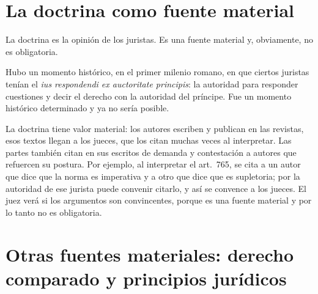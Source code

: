 \documentclass[12pt,oneside]{book}
\begin{document}
\section{La doctrina como fuente material}

La doctrina es la opinión de los juristas. Es una fuente material y, obviamente, no es obligatoria.

Hubo un momento histórico, en el primer milenio romano, en que ciertos juristas tenían el \textit{ius respondendi ex auctoritate principis}: la autoridad para responder cuestiones y decir el derecho con la autoridad del príncipe. Fue un momento histórico determinado y ya no sería posible.

La doctrina tiene valor material: los autores escriben y publican en las revistas, esos textos llegan a los jueces, que los citan muchas veces al interpretar. Las partes también citan en sus escritos de demanda y contestación a autores que refuercen su postura. Por ejemplo, al interpretar el art.~765, se cita a un autor que dice que la norma es imperativa y a otro que dice que es supletoria; por la autoridad de ese jurista puede convenir citarlo, y así se convence a los jueces. El juez verá si los argumentos son convincentes, porque es una fuente material y por lo tanto no es obligatoria.

\section{Otras fuentes materiales: derecho comparado y principios jurídicos}
\end{document}
